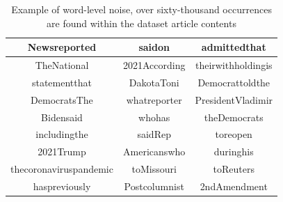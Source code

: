 \begin{table}[htbp]
    \centering
    \small
    \begin{tabular}{| c | c | c |}
        \hline
        Newsreported           & saidon        & admittedthat       \\
        \hline
        TheNational            & 2021According & theirwithholdingis \\
        \hline
        statementthat          & DakotaToni    & Democrattoldthe    \\
        \hline
        DemocratsThe           & whatreporter  & PresidentVladimir  \\
        \hline
        Bidensaid              & whohas        & theDemocrats       \\
        \hline
        includingthe           & saidRep       & toreopen           \\
        \hline
        2021Trump              & Americanswho  & duringhis          \\
        \hline
        thecoronaviruspandemic & toMissouri    & toReuters          \\
        \hline
        haspreviously          & Postcolumnist & 2ndAmendment       \\
        \hline
    \end{tabular}
    \caption{Example of word-level noise, over sixty-thousand occurrences are found within the dataset article contents}
    \label{table:conjoined_words}
\end{table}

